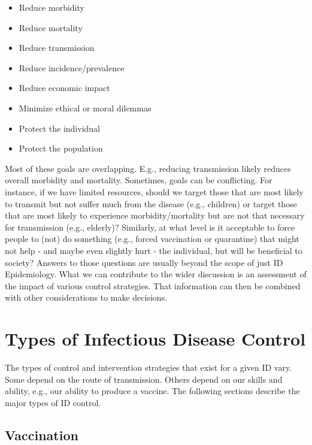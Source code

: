 \documentclass[
]{book}
\providecommand{\tightlist}{%
  \setlength{\itemsep}{0pt}\setlength{\parskip}{0pt}}
\begin{document}
\begin{itemize}
\tightlist
\item
  Reduce morbidity
\item
  Reduce mortality
\item
  Reduce transmission
\item
  Reduce incidence/prevalence
\item
  Reduce economic impact
\item
  Minimize ethical or moral dilemmas
\item
  Protect the individual
\item
  Protect the population
\end{itemize}

Most of these goals are overlapping. E.g., reducing transmission likely reduces overall morbidity and mortality. Sometimes, goals can be conflicting. For instance, if we have limited resources, should we target those that are most likely to transmit but not suffer much from the disease (e.g., children) or target those that are most likely to experience morbidity/mortality but are not that necessary for transmission (e.g., elderly)? Similarly, at what level is it acceptable to force people to (not) do something (e.g., forced vaccination or quarantine) that might not help - and maybe even slightly hurt - the individual, but will be beneficial to society? Answers to those questions are usually beyond the scope of just ID Epidemiology. What we can contribute to the wider discussion is an assessment of the impact of various control strategies. That information can then be combined with other considerations to make decisions.

\hypertarget{types-of-infectious-disease-control}{%
\section{Types of Infectious Disease Control}\label{types-of-infectious-disease-control}}

The types of control and intervention strategies that exist for a given ID vary. Some depend on the route of transmission. Others depend on our skills and ability, e.g., our ability to produce a vaccine. The following sections describe the major types of ID control.

\hypertarget{vaccination}{%
\subsection{Vaccination}\label{vaccination}}
\end{document}
